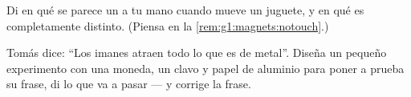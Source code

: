 \begin{exercise}[$\star$]\label{exo:g1:magnets:8}
Di en qué se parece un  a tu mano cuando mueve un juguete, y en
qué es completamente distinto. (Piensa en la
\cref{rem:g1:magnets:notouch}.)
\end{exercise}

\begin{exercise}[$\star\star$]\label{exo:g1:magnets:9}
Tomás dice: ``Los imanes atraen todo lo que es de metal''. Diseña
un pequeño experimento con una moneda, un clavo y papel de aluminio
para poner a prueba su frase, di lo que va a pasar --- y corrige la
frase.
\end{exercise}
